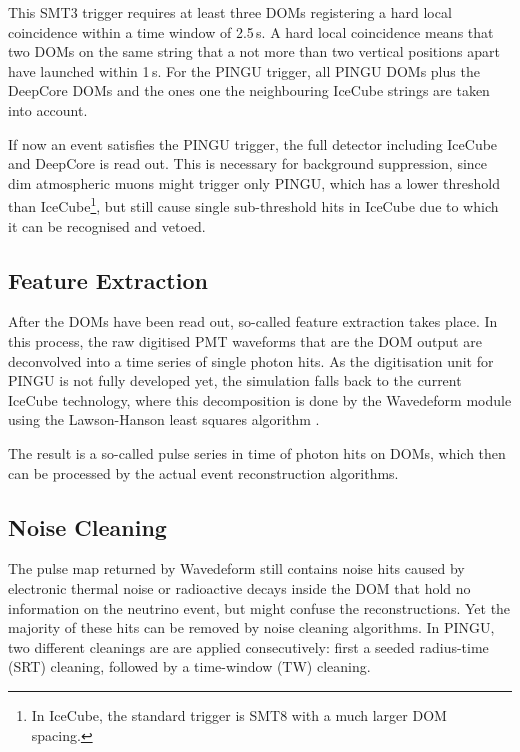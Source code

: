 This SMT3 trigger requires at least three DOMs registering a hard local
coincidence within a time window of 2.5\,\textmu s. A hard local coincidence
means that two DOMs on the same string that a not more than two vertical
positions apart have launched within 1\,\textmu s. For the PINGU trigger, all
PINGU DOMs plus the DeepCore DOMs and the ones one the neighbouring IceCube
strings are taken into account.

If now an event satisfies the PINGU trigger, the full detector including
IceCube and DeepCore is read out. This is necessary for background suppression,
since dim atmospheric muons might trigger only PINGU, which has a lower
threshold than IceCube\footnote{In IceCube, the standard trigger is SMT8 with a
much larger DOM spacing.}, but still cause single sub-threshold hits in IceCube
due to which it can be recognised and vetoed.


\subsection{Feature Extraction}
\label{sec:reco_feature}

After the DOMs have been read out, so-called feature extraction takes place. In
this process, the raw digitised PMT waveforms that are the DOM output are
deconvolved into a time series of single photon hits. As the digitisation unit
for PINGU is not fully developed yet, the simulation falls back to the current
IceCube technology, where this decomposition is done by the Wavedeform module
\cite{Wavedeform} using the Lawson-Hanson least squares algorithm
\cite{LawsonHanson}.

The result is a so-called pulse series in time of photon hits on DOMs, which
then can be processed by the actual event reconstruction algorithms.

\subsection{Noise Cleaning}
\label{sec:reco_noise}

The pulse map returned by Wavedeform still contains noise hits caused by
electronic thermal noise or radioactive decays inside the DOM that hold no
information on the neutrino event, but might confuse the reconstructions. Yet
the majority of these hits can be removed by noise cleaning algorithms. In
PINGU, two different cleanings are are applied consecutively: first a seeded
radius-time (SRT) cleaning, followed by a time-window (TW) cleaning.

